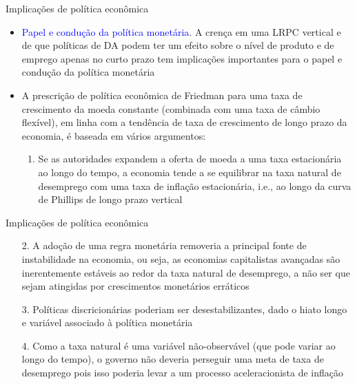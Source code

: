 \documentclass[10pt]{beamer}
\begin{document}
\begin{frame}{Implicações de política econômica}
    \begin{itemize}
        \item \textcolor{blue}{Papel e condução da política monetária}. A crença em uma LRPC vertical e de que políticas de DA podem ter um efeito sobre o nível de produto e de emprego apenas no curto prazo tem implicações importantes para o papel e condução da política monetária
        \bigskip
        \item A prescrição de política econômica de Friedman para uma taxa de crescimento da moeda constante (combinada com uma taxa de câmbio flexível), em linha com a tendência de taxa de crescimento de longo prazo da economia, é baseada em vários argumentos:
        \bigskip
        \begin{enumerate}
            \item Se as autoridades expandem a oferta de moeda a uma taxa estacionária ao longo do tempo, a economia tende a se equilibrar na taxa natural de desemprego com uma taxa de inflação estacionária, i.e., ao longo da curva de Phillips de longo prazo vertical
        \end{enumerate}
    \end{itemize}    
\end{frame}

\begin{frame}{Implicações de política econômica}
            \begin{enumerate}            
            \item[2.] A adoção de uma regra monetária removeria a principal fonte de instabilidade na economia, ou seja, as economias capitalistas avançadas são inerentemente estáveis ao redor da taxa natural de desemprego, a não ser que sejam atingidas por crescimentos monetários erráticos
            \bigskip
            \item[3.] Políticas discricionárias poderiam ser desestabilizantes, dado o hiato longo e variável associado à política monetária
            \bigskip
            \item[4.] Como a taxa natural é uma variável não-observável (que pode variar ao longo do tempo), o governo não deveria perseguir uma meta de taxa de desemprego pois isso poderia levar a um processo aceleracionista de inflação
        \end{enumerate}
    
\end{frame}
\end{document}
